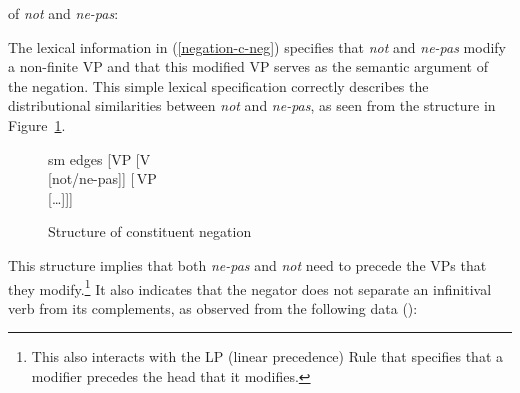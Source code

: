 \documentclass[output=paper
	        ,collection
	        ,collectionchapter
 	        ,biblatex
                ,babelshorthands
                ,newtxmath
                ,draftmode
                ,colorlinks, citecolor=brown
]{langscibook}
\begin{document}
\begin{exe}
\begin{xlist}
\begin{exe}
\begin{xlist}
\ea
\label{negation-c-neg}
\localvs of \emph{not} and \emph{ne-pas}:\\
\z


\noindent %
The lexical information in (\ref{negation-c-neg}) specifies that
\textit{not} and \textit{ne-pas} modify a non-finite VP and that this
modified VP serves as the semantic argument of the negation.
This simple lexical specification correctly describes the
distributional similarities between  \textit{not} and 
\textit{ne-pas}, as seen from the structure in Figure~\ref{negation-not-vp-mod}.

\begin{figure}
	\begin{forest}
		sm edges
		[VP
			[V\\
					[not/ne-pas]]
			[\,VP\\
					[\ldots]]]
	\end{forest}
\caption{Structure of constituent negation}\label{negation-not-vp-mod}
\end{figure}
\noindent
This structure implies that
both \textit{ne-pas} and \textit{not} need to precede the VPs that they modify.\footnote{
This also interacts with the LP (linear precedence) Rule that specifies
that a modifier precedes the head that it modifies.}  It also
indicates that the negator does not separate an infinitival verb
from its complements, as observed from the following data (\citealp[]{KS:02}):

\eal
{} \label{negation-35a}
 \label{negation-35b}
\zl

\eal
{} \label{negation-34a}
 \label{negation-34b}
\zl




\end{xlist}
\end{exe}
\end{xlist}
\end{exe}
\end{document}
